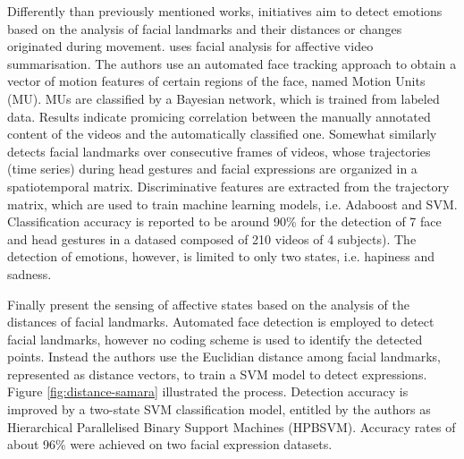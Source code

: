 
Differently than previously mentioned works, initiatives aim to detect emotions based on the analysis of facial landmarks and their distances or changes originated during movement. \textcite{joho2009exploiting} uses facial analysis for affective video summarisation. The authors use an automated face tracking approach to obtain a vector of motion features of certain regions of the face, named Motion Units (MU). MUs are classified by a Bayesian network, which is trained from labeled data. Results indicate promicing correlation between the manually annotated content of the videos and the automatically classified one. Somewhat similarly \textcite{akakin2010spatiotemporal} detects facial landmarks over consecutive frames of videos, whose trajectories (time series) during head gestures and facial expressions are organized in a spatiotemporal matrix. Discriminative features are extracted from the trajectory matrix, which are used to train machine learning models, i.e. Adaboost and SVM. Classification accuracy is reported to be around 90\% for the detection of 7 face and head gestures in a datased composed of 210 videos of 4 subjects). The detection of emotions, however, is limited to only two states, i.e. hapiness and sadness.

Finally \textcite{samara2016sensing} present the sensing of affective states based on the analysis of the distances of facial landmarks. Automated face detection is employed to detect facial landmarks, however no coding scheme is used to identify the detected points. Instead the authors use the Euclidian distance among facial landmarks, represented as distance vectors, to train a SVM model to detect expressions. Figure \ref{fig:distance-samara} illustrated the process. Detection accuracy is improved by a two-state SVM classification model, entitled by the authors as Hierarchical Parallelised Binary Support Machines (HPBSVM). Accuracy rates of about 96\% were achieved on two facial expression datasets.
